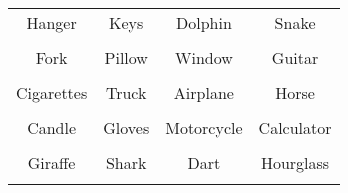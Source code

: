 \documentclass[12pt,a4paper]{article}
\begin{document}
\thispagestyle{empty}
\begin{table}[]
\centering
\Huge
\begin{tabular}{cccc}
 Hanger& Keys& Dolphin& Snake\\  & & & \\
 Fork& Pillow& Window& Guitar\\  & & & \\
 Cigarettes& Truck& Airplane& Horse\\  & & & \\
 Candle& Gloves& Motorcycle& Calculator\\  & & & \\
 Giraffe& Shark& Dart& Hourglass\\  & & & \\
\end{tabular}
\end{table}
\end{document}
